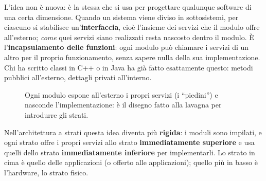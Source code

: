 L'idea non è nuova: è la stessa che si usa per progettare qualunque software di una certa dimensione. Quando
un sistema viene diviso in sottosistemi, per ciascuno si stabilisce un'\textbf{interfaccia}, cioè l'insieme
dei servizi che il modulo offre all'esterno; \emph{come} quei servizi siano realizzati resta nascosto dentro
il modulo. È l'\textbf{incapsulamento delle funzioni}: ogni modulo può chiamare i servizi di un altro per il
proprio funzionamento, senza sapere nulla della sua implementazione. Chi ha scritto classi in C++ o in Java
ha già fatto esattamente questo: metodi pubblici all'esterno, dettagli privati all'interno.

\begin{figure}[H]
\centering
{}
\caption{Ogni modulo espone all'esterno i propri servizi (i ``piedini'') e nasconde l'implementazione: è il disegno fatto alla lavagna per introdurre gli strati.}
\end{figure}

Nell'architettura a strati questa idea diventa più \textbf{rigida}: i moduli sono impilati, e ogni strato
offre i propri servizi allo strato \textbf{immediatamente superiore} e usa quelli dello strato
\textbf{immediatamente inferiore} per implementarli. Lo strato in cima è quello delle applicazioni (o offerto
alle applicazioni); quello più in basso è l'hardware, lo strato fisico.

